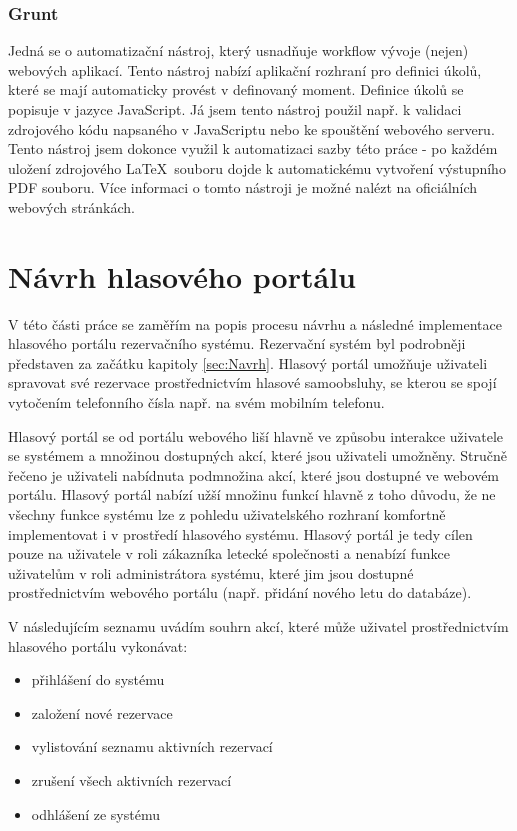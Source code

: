\documentclass[ing,male,java,dept460]{diploma}						%
\begin{document}
\subsubsection{Grunt}
Jedná se o automatizační nástroj, který usnadňuje workflow vývoje (nejen) webových aplikací. Tento nástroj nabízí aplikační rozhraní pro definici úkolů, které se mají automaticky provést v definovaný moment. Definice úkolů se popisuje v jazyce JavaScript. Já jsem tento nástroj použil např. k validaci zdrojového kódu napsaného v JavaScriptu nebo ke spouštění webového serveru. Tento nástroj jsem dokonce využil k automatizaci sazby této práce - po každém uložení zdrojového \LaTeX\ souboru dojde k automatickému vytvoření výstupního PDF souboru. Více informaci o tomto nástroji je možné nalézt na oficiálních webových stránkách\cite{grunt}.

\section{Návrh hlasového portálu}
\label{sec:Navrh_hlasoveho_portalu}
V této části práce se zaměřím na popis procesu návrhu a následné implementace hlasového portálu rezervačního systému. Rezervační systém byl podrobněji představen za začátku kapitoly \ref{sec:Navrh}. Hlasový portál umožňuje uživateli spravovat své rezervace prostřednictvím hlasové samoobsluhy, se kterou se spojí vytočením telefonního čísla např. na svém mobilním telefonu.

Hlasový portál se od portálu webového liší hlavně ve způsobu interakce uživatele se systémem a množinou dostupných akcí, které jsou uživateli umožněny. Stručně řečeno je uživateli nabídnuta podmnožina akcí, které jsou dostupné ve webovém portálu. Hlasový portál nabízí užší množinu funkcí hlavně z toho důvodu, že ne všechny funkce systému lze z pohledu uživatelského rozhraní komfortně implementovat i v prostředí hlasového systému. Hlasový portál je tedy cílen pouze na uživatele v roli zákazníka letecké společnosti a nenabízí funkce uživatelům v roli administrátora systému, které jim jsou dostupné prostřednictvím webového portálu (např. přidání nového letu do databáze).

V následujícím seznamu uvádím souhrn akcí, které může uživatel prostřednictvím hlasového portálu vykonávat:

\begin{itemize}
\item přihlášení do systému
\item založení nové rezervace
\item vylistování seznamu aktivních rezervací
\item zrušení všech aktivních rezervací
\item odhlášení ze systému
\end{itemize}
\end{document}

